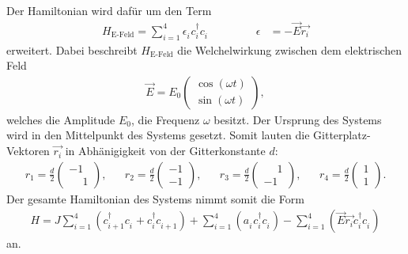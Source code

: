 Der Hamiltonian wird dafür um den Term
\begin{align}
  H_\text{E-Feld}=\sum_{i=1}^4 \epsilon_i^{\phantom{\dag}} c_i^\dag c_i^{\phantom{\dag}}  \,\,   \quad \quad  \,\, & &\epsilon&=-\vec{E} \vec{r_i}
\end{align}
erweitert. Dabei beschreibt $H_\text{E-Feld}$ die Welchelwirkung zwischen dem elektrischen Feld
\begin{align}
  \vec E=E_0\begin{pmatrix}
\cos\left(\omega t\right)\\
\sin\left(\omega t\right)
 \end{pmatrix},
\end{align}
welches die Amplitude $E_0$, die Frequenz $\omega$ besitzt.
Der Ursprung des Systems wird in den Mittelpunkt des Systems gesetzt.
Somit lauten die Gitterplatz-Vektoren $\vec{r_i}$ in Abhänigigkeit von der Gitterkonstante $d$:
\begin{align}
  r_1=\frac{d}{2}\begin{pmatrix}-1  \\ \phantom{-}1 \end{pmatrix},& &
  r_2=\frac{d}{2}\begin{pmatrix}-1  \\ -1 \end{pmatrix},& &
  r_3=\frac{d}{2}\begin{pmatrix}\phantom{-}1  \\ -1 \end{pmatrix},& &
  r_4=\frac{d}{2}\begin{pmatrix}1  \\ 1 \end{pmatrix}.
\end{align}
Der gesamte Hamiltonian des Systems nimmt somit die Form
\begin{align}
H=J\sum_{i=1}^4 \left(c_{i+1}^\dag c_i^{\phantom{\dag}} + c_{i}^\dag c_{i+1}^{\phantom{\dag}}\right)
+\sum_{i=1}^4 \left(a_i^{\phantom{\dag}} c_i^\dag c_i^{\phantom{\dag}}\right)
-\sum_{i=1}^4 \left(\vec{E} \vec{r_i}  c_i^\dag c_i^{\phantom{\dag}}\right)
\end{align}
an.



